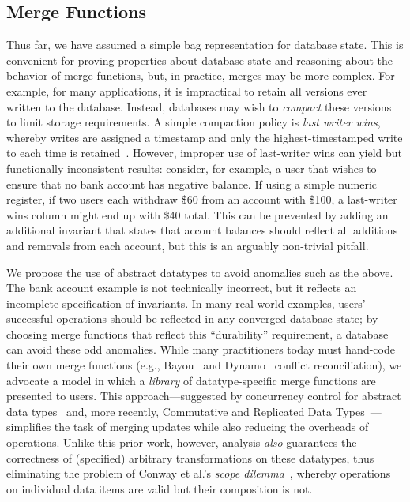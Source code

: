 \subsection{Merge Functions}
\label{sec:merge}

Thus far, we have assumed a simple bag representation for database
state. This is convenient for proving properties about database state
and reasoning about the behavior of merge functions, but, in practice,
merges may be more complex. For example, for many applications, it is
impractical to retain all versions ever written to the
database. Instead, databases may wish to \textit{compact} these
versions to limit storage requirements. A simple compaction policy is
\textit{last writer wins}, whereby writes are assigned a timestamp and
only the highest-timestamped write to each time is
retained~\cite{dynamo}. However, improper use of last-writer wins can
yield \iconfluent but functionally inconsistent results: consider, for
example, a user that wishes to ensure that no bank account has
negative balance. If using a simple numeric register, if two users
each withdraw \$60 from an account with \$100, a last-writer wins
column might end up with \$40 total. This can be prevented by adding
an additional invariant that states that account balances should
reflect all additions and removals from each account, but this is an
arguably non-trivial pitfall.

We propose the use of abstract datatypes to avoid anomalies such as
the above. The bank account example is not technically incorrect, but
it reflects an incomplete specification of invariants. In many
real-world examples, users' successful operations should be reflected
in any converged database state; by choosing merge functions that
reflect this ``durability'' requirement, a database can avoid these
odd anomalies. While many practitioners today must hand-code their own
merge functions (e.g., Bayou~\cite{bayou} and Dynamo~\cite{dynamo}
conflict reconciliation), we advocate a model in which a
\textit{library} of datatype-specific merge functions are presented to
users. This approach---suggested by concurrency control for abstract
data types~\cite{weihl-thesis} and, more recently, Commutative and
Replicated Data Types~\cite{crdt}---simplifies the task of merging
updates while also reducing the overheads of operations. Unlike this
prior work, however, \iconfluence analysis \textit{also} guarantees
the correctness of (specified) arbitrary transformations on these
datatypes, thus eliminating the problem of Conway et al.'s
\textit{scope dilemma}~\cite{blooml}, whereby operations on individual
data items are valid but their composition is not.





